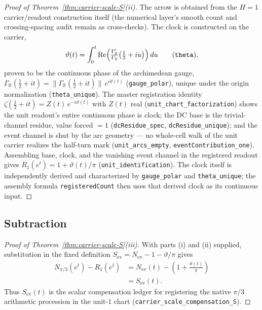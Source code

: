 \documentclass[11pt]{article}
\theoremstyle{definition}
\renewcommand{\Re}{\operatorname{Re}}
\begin{document}
\begin{proof}[Proof of Theorem~\textup{\ref{thm:carrier-scale-S}(ii)}]
The arrow is obtained from the \(H=1\) carrier/readout construction itself
(the numerical layer's smooth count and crossing-spacing audit remain as
cross-checks).  The clock is constructed on the carrier,
\[
\vartheta(t)=\int_0^t\Re\Bigl(\tfrac{\Gamma_{\mathbb R}'}{\Gamma_{\mathbb R}}
\bigl(\tfrac12+iu\bigr)\Bigr)\,du
\qquad(\texttt{theta}),
\]
proven to be the continuous phase of the archimedean gauge,
\(\Gamma_{\mathbb R}(\tfrac12+it)
=\|\Gamma_{\mathbb R}(\tfrac12+it)\|\,e^{i\vartheta(t)}\)
(\texttt{gauge\_polar}), unique under the origin normalization
(\texttt{theta\_unique}).  The master registration identity
\(\zeta(\tfrac12+it)=Z(t)\,e^{-i\vartheta(t)}\) with \(Z(t)\) real
(\texttt{unit\_chart\_factorization}) shows the unit readout's entire
continuous phase is clock; the DC base is the trivial-channel residue, value
forced \(=1\) (\texttt{dcResidue\_spec}, \texttt{dcResidue\_unique}); and the
event channel is shut by the arc geometry --- no whole-cell walk of the unit
carrier realizes the half-turn mark (\texttt{unit\_arcs\_empty},
\texttt{eventContribution\_one}).  Assembling base, clock, and the vanishing
event channel in the registered readout gives
\(R_1(e^t)=1+\vartheta(t)/\pi\) (\texttt{unit\_identification}).  The clock
itself is independently derived and characterized by \texttt{gauge\_polar}
and \texttt{theta\_unique}; the assembly formula \texttt{registeredCount}
then uses that derived clock as its continuous input.
\end{proof}

\subsection{Subtraction}

\begin{proof}[Proof of Theorem~\textup{\ref{thm:carrier-scale-S}(iii)}]
With parts (i) and (ii) supplied, substitution in the fixed definition
\(S_{\mathrm{ev}}=N_{\mathrm{ev}}-1-\vartheta/\pi\) gives
\[
\begin{aligned}
N_{\pi/3}(e^t)-R_1(e^t)
&=
N_{\mathrm{ev}}(t)-\left(1+\frac{\vartheta(t)}{\pi}\right)\\
&=S_{\mathrm{ev}}(t).
\end{aligned}
\]
Thus \(S_{\mathrm{ev}}(t)\) is the scalar compensation ledger for
registering the native
\(\pi/3\) arithmetic procession in the unit-\(1\) chart
(\texttt{carrier\_scale\_compensation\_S}).
\end{proof}
\end{document}
